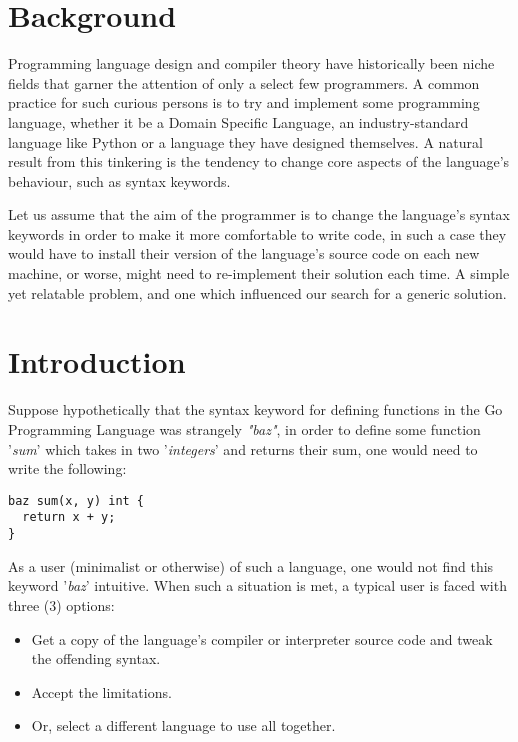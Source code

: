 \documentclass[a4paper,9pt]{article}
\begin{document}
\begin{multicols}{2}

\section{Background}

Programming language design and compiler theory have historically been niche fields that garner the attention of only a select few programmers. A common practice for such curious persons is to try and implement some programming language, whether it be a Domain Specific Language, an industry-standard language like Python \cite{Python} or a language they have designed themselves. A natural result from this tinkering is the tendency to change core aspects of the language's behaviour, such as syntax keywords.

Let us assume that the aim of the programmer is to change the language's syntax keywords in order to make it more comfortable to write code, in such a case they would have to install their version of the language's source code on each new machine, or worse, might need to re-implement their solution each time. A simple yet relatable problem, and one which influenced our search for a generic solution.

\section{Introduction}

Suppose hypothetically that the syntax keyword for defining functions in the Go Programming Language \cite{Go} was strangely \textit{"baz"}, in order to define some function '\textit{sum}' which takes in two '\textit{integers}' and returns their sum, one would need to write the following:

\begin{verbatim}
baz sum(x, y) int {
  return x + y;
}
\end{verbatim}

As a user (minimalist or otherwise) of such a language, one would not find this keyword '\textit{baz}' intuitive. When such a situation is met, a typical user is faced with three (3) options:

\begin{itemize}
	\item Get a copy of the language's compiler or interpreter source code and tweak the offending syntax.
	\item Accept the limitations.
	\item Or, select a different language to use all together.
\end{itemize}


\end{multicols}
\end{document}
